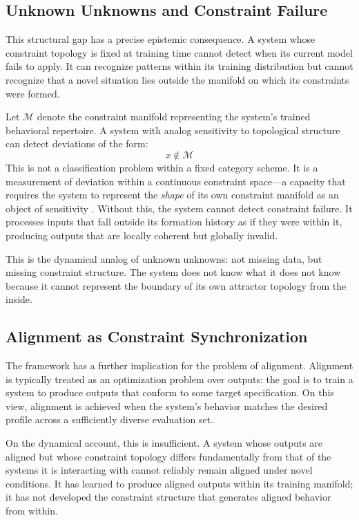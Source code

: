 \documentclass[11pt]{article}
\begin{document}
\subsection{Unknown Unknowns and Constraint Failure}

This structural gap has a precise epistemic consequence. A system whose constraint
topology is fixed at training time cannot detect when its current model fails to apply.
It can recognize patterns within its training distribution but cannot recognize that a
novel situation lies outside the manifold on which its constraints were formed.

Let $\mathcal{M}$ denote the constraint manifold representing the system's trained
behavioral repertoire. A system with analog sensitivity to topological structure can
detect deviations of the form:
\[
x \notin \mathcal{M}
\]
This is not a classification problem within a fixed category scheme. It is a measurement
of deviation within a continuous constraint space—a capacity that requires the system
to represent the \emph{shape} of its own constraint manifold as an object of sensitivity
\citep{friston2013}. Without this, the system cannot detect constraint failure. It
processes inputs that fall outside its formation history as if they were within it,
producing outputs that are locally coherent but globally invalid.

This is the dynamical analog of unknown unknowns: not missing data, but missing constraint
structure. The system does not know what it does not know because it cannot represent the
boundary of its own attractor topology from the inside.

\subsection{Alignment as Constraint Synchronization}

The framework has a further implication for the problem of alignment. Alignment is
typically treated as an optimization problem over outputs: the goal is to train a system
to produce outputs that conform to some target specification. On this view, alignment is
achieved when the system's behavior matches the desired profile across a sufficiently
diverse evaluation set.

On the dynamical account, this is insufficient. A system whose outputs are aligned but
whose constraint topology differs fundamentally from that of the systems it is interacting
with cannot reliably remain aligned under novel conditions. It has learned to produce
aligned outputs within its training manifold; it has not developed the constraint
structure that generates aligned behavior from within.
\end{document}
